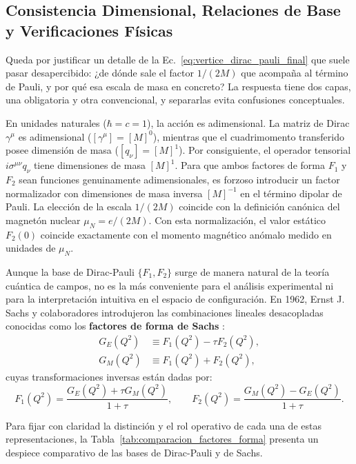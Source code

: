 \documentclass[10pt,a4paper]{article}
\begin{document}
\subsection{Consistencia Dimensional, Relaciones de Base y Verificaciones Físicas}
\label{subsec:consistencia_bases}
Queda por justificar un detalle de la Ec.~\eqref{eq:vertice_dirac_pauli_final} que suele pasar desapercibido: ¿de dónde sale el factor $1/(2M)$ que acompaña al término de Pauli, y por qué esa escala de masa en concreto? La respuesta tiene dos capas, una obligatoria y otra convencional, y separarlas evita confusiones conceptuales.

En unidades naturales ($\hbar = c = 1$), la acción es adimensional. La matriz de Dirac $\gamma^\mu$ es adimensional ($[\gamma^\mu] = [M]^0$), mientras que el cuadrimomento transferido posee dimensión de masa ($[q_\nu] = [M]^1$). Por consiguiente, el operador tensorial $i\sigma^{\mu\nu} q_\nu$ tiene dimensiones de masa $[M]^1$. Para que ambos factores de forma $F_1$ y $F_2$ sean funciones genuinamente adimensionales, es forzoso introducir un factor normalizador con dimensiones de masa inversa $[M]^{-1}$ en el término dipolar de Pauli. La elección de la escala $1/(2M)$ coincide con la definición canónica del magnetón nuclear $\mu_N = e/(2M)$. Con esta normalización, el valor estático $F_2(0)$ coincide exactamente con el momento magnético anómalo medido en unidades de $\mu_N$.

Aunque la base de Dirac-Pauli $\{F_1, F_2\}$ surge de manera natural de la teoría cuántica de campos, no es la más conveniente para el análisis experimental ni para la interpretación intuitiva en el espacio de configuración. En 1962, Ernst J. Sachs y colaboradores introdujeron las combinaciones lineales desacopladas conocidas como los \textbf{factores de forma de Sachs} \cite{sachs1962}:
\begin{align}
G_E(Q^2) &\equiv F_1(Q^2) - \tau F_2(Q^2), \label{eq:sachs_ge_def} \\
G_M(Q^2) &\equiv F_1(Q^2) + F_2(Q^2), \label{eq:sachs_gm_def}
\end{align}
cuyas transformaciones inversas están dadas por:
\begin{equation}
F_1(Q^2) = \frac{G_E(Q^2) + \tau G_M(Q^2)}{1 + \tau}, \qquad F_2(Q^2) = \frac{G_M(Q^2) - G_E(Q^2)}{1 + \tau}.
\label{eq:sachs_inversas}
\end{equation}

Para fijar con claridad la distinción y el rol operativo de cada una de estas representaciones, la Tabla~\ref{tab:comparacion_factores_forma} presenta un despiece comparativo de las bases de Dirac-Pauli y de Sachs.
\end{document}
